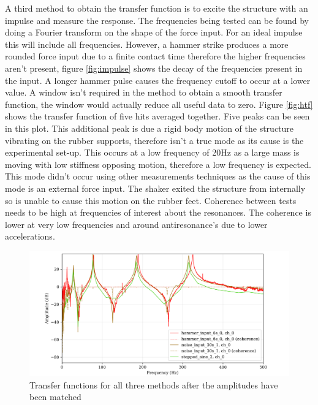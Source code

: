 \documentclass[twoside,onecolumn]{article}
\begin{document}
A third method to obtain the transfer function is to excite the structure with an impulse and measure the response. The frequencies being tested can be found by doing a Fourier transform on the shape of the force input. For an ideal impulse this will include all frequencies. However, a hammer strike produces a more rounded force input due to a finite contact time therefore the higher frequencies aren't present, figure \ref{fig:impulse} shows the decay of the frequencies present in the input. A longer hammer pulse causes the frequency cutoff to occur at a lower value. A window isn't required in the method to obtain a smooth transfer function, the window would actually reduce all useful data to zero. Figure \ref{fig:htf} shows the transfer function of five hits averaged together. Five peaks can be seen in this plot. This additional peak is due a rigid body motion of the structure vibrating on the rubber supports, therefore isn't a true mode as its cause is the experimental set-up. This occurs at a low frequency of 20Hz as a large mass is moving with low stiffness opposing motion, therefore a low frequency is expected. This mode didn't occur using  other measurements techniques as the cause of this mode is an external force input. The shaker exited the structure from internally so is unable to cause this motion on the rubber feet. Coherence between tests needs to be high at frequencies of interest about the resonances. The coherence is lower at very low frequencies and around antiresonance's due to lower accelerations.


\begin{figure}[!htb]
  \centering
    \includegraphics[width=\linewidth]{3-updatedmathcedamplitudes}
  \caption{Transfer functions for all three methods after the amplitudes have been matched}
  \label{fig:shifted}
\end{figure}
\end{document}
